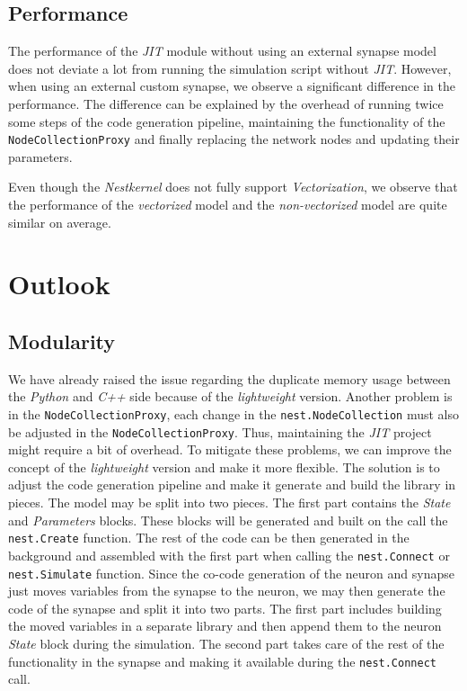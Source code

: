 \subsection*{Performance}

The performance of the \emph{JIT} module without using an external synapse model does not deviate a lot from running the simulation script without \emph{JIT}. However, when using an external custom synapse, we observe a significant difference in the performance. The difference can be explained by the overhead of running twice some steps of the code generation pipeline, maintaining the functionality of the \texttt{NodeCollectionProxy} and finally replacing the network nodes and updating their parameters.

Even though the \emph{Nestkernel} does not fully support \emph{Vectorization}, we observe that the performance of the \emph{vectorized} model and the \emph{non-vectorized} model are quite similar on average.

\section{Outlook}

\subsection*{Modularity}

We have already raised the issue regarding the duplicate memory usage between the \emph{Python} and \emph{C++} side because of the \emph{lightweight} version. Another problem is in the \texttt{NodeCollectionProxy}, each change in the \texttt{nest.NodeCollection} must also be adjusted in the \texttt{NodeCollectionProxy}. Thus, maintaining the \emph{JIT} project might require a bit of overhead. To mitigate these problems, we can improve the concept of the \emph{lightweight} version and make it more flexible. The solution is to adjust the code generation pipeline and make it generate and build the library in pieces. The model may be split into two pieces. The first part contains the \emph{State} and \emph{Parameters} blocks. These blocks will be generated and built on the call the \texttt{nest.Create} function. The rest of the code can be then generated in the background and assembled with the first part when calling the \texttt{nest.Connect} or \texttt{nest.Simulate} function. Since the co-code generation of the neuron and synapse just moves variables from the synapse to the neuron, we may then generate the code of the synapse and split it into two parts. The first part includes building the moved variables in a separate library and then append them to the neuron \emph{State} block during the simulation. The second part takes care of the rest of the functionality in the synapse and making it available during the \texttt{nest.Connect} call.

